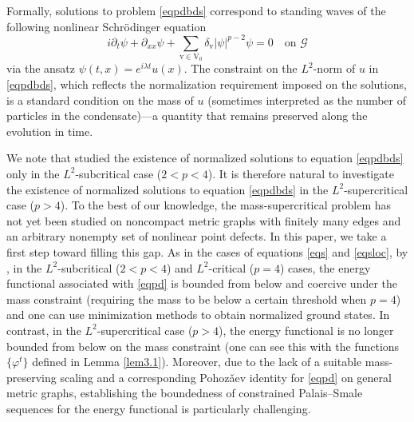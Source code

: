 \documentclass[11pt]{amsart}
\newcommand{\V}{\mathrm{V}}
\newcommand{\vv}{\mathrm{v}}
\numberwithin{equation}{section}
\begin{document}
Formally, solutions to problem \eqref{eqpdbds} correspond to standing waves of the following nonlinear Schr\"odinger equation
\[
i\partial_t \psi + \partial_{xx} \psi + \sum_{\vv \in \V_0} \delta_\vv |\psi|^{p-2} \psi = 0 \quad \text{on } \mathcal{G}
\]
via the ansatz $\psi(t,x) = e^{i\lambda t} u(x)$. The constraint on the $L^2$-norm of $u$ in \eqref{eqpdbds},  which reflects the normalization requirement imposed on the solutions, is a standard condition on the mass of $u$ (sometimes interpreted as the number of particles in the condensate)---a quantity that remains preserved along the evolution in time.

We note that \cite{BDS}  studied the existence of normalized solutions to equation \eqref{eqpdbds} only in the  $L^2$-subcritical  case ($2<p<4$). It is therefore natural to investigate the existence of normalized solutions to equation \eqref{eqpdbds} in the  $L^2$-supercritical case ($p>4$). To the best of our knowledge, the mass-supercritical problem has not yet been studied on noncompact metric graphs with finitely many edges and an arbitrary nonempty set of nonlinear point defects. In this paper, we take a first step toward filling this gap. As in the cases of equations \eqref{eqs} and \eqref{eqsloc}, by \cite[Lemma 2.2]{BDS}, in the $L^2$-subcritical ($2<p<4$) and $L^2$-critical ($p=4$) cases, the energy functional associated with \eqref{eqpd} is bounded from below and coercive under the mass constraint (requiring the mass to be below a certain threshold when $p=4$) and one can use minimization methods to obtain normalized ground states. In contrast, in the $L^2$-supercritical case ($p>4$), the energy functional is no longer bounded from  below on the mass constraint (one can see this with the functions $\{\varphi^t\}$ defined in Lemma \ref{lem3.1}). Moreover, due to the lack of a suitable mass-preserving scaling and a corresponding Pohoz\v{a}ev identity for \eqref{eqpd} on general metric graphs, establishing the boundedness of constrained Palais--Smale sequences for the energy functional is particularly challenging.
\end{document}

